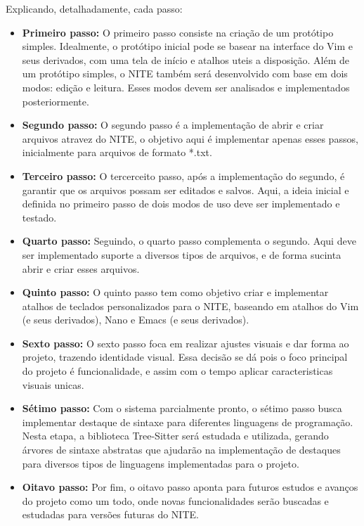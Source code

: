 Explicando, detalhadamente, cada passo:

\begin{itemize}
    \item \textbf{Primeiro passo:} O primeiro passo consiste na criação de um
        protótipo simples. Idealmente, o protótipo inicial pode se basear na
        interface do Vim e seus derivados, com uma tela de início e atalhos uteis
        a disposição. Além de um protótipo simples, o NITE também será desenvolvido
        com base em dois modos: edição e leitura. Esses modos devem ser analisados
        e implementados posteriormente.

    \item \textbf{Segundo passo:} O segundo passo é a implementação de abrir e
        criar arquivos atravez do NITE, o objetivo aqui é implementar apenas esses
        passos, inicialmente para arquivos de formato *.txt.

    \item \textbf{Terceiro passo:} O tercerceito passo, após a implementação do segundo,
        é garantir que os arquivos possam ser editados e salvos. Aqui, a ideia
        inicial e definida no primeiro passo de dois modos de uso deve ser
        implementado e testado.

    \item \textbf{Quarto passo:} Seguindo, o quarto passo complementa o segundo.
        Aqui deve ser implementado suporte a diversos tipos de arquivos, e de forma
        sucinta abrir e criar esses arquivos.

    \item \textbf{Quinto passo:} O quinto passo tem como objetivo criar e
        implementar atalhos de teclados personalizados para o NITE, baseando em atalhos
        do Vim (e seus derivados), Nano e Emacs (e seus derivados).

    \item \textbf{Sexto passo:} O sexto passo foca em realizar ajustes visuais e
        dar forma ao projeto, trazendo identidade visual. Essa decisão se dá
        pois o foco principal do projeto é funcionalidade, e assim com o tempo aplicar
        caracteristicas visuais unicas.

    \item \textbf{Sétimo passo:} Com o sistema parcialmente pronto, o sétimo passo
        busca implementar destaque de sintaxe para diferentes linguagens de programação.
        Nesta etapa, a biblioteca Tree-Sitter \cite{tree-sitter} será estudada e
        utilizada, gerando árvores de sintaxe abstratas que ajudarão na
        implementação de destaques para diversos tipos de linguagens
        implementadas para o projeto.

    \item \textbf{Oitavo passo:} Por fim, o oitavo passo aponta para futuros estudos
        e avanços do projeto como um todo, onde novas funcionalidades serão
        buscadas e estudadas para versões futuras do NITE.
\end{itemize}

